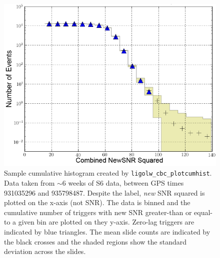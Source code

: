 \begin{figure}[p]
\label{fig:sample_plotcumhist}
\begin{center}
\includegraphics[width=5in]{figures/H1L1V1-ligolw_cbc_plotcumhist_FULL_DATA_CAT_4_VETO_cumhist_combined_snr_sq_ALL_DATA_PLOTTED_OPEN_BOX-931035296-4763191.png}
\end{center}
\caption{Sample cumulative histogram created by \texttt{ligolw\_cbc\_plotcumhist}. Data taken from $\sim6$ weeks of \ac{S6} data, between GPS times 931035296 and 935798487. Despite the label, \emph{new} \ac{SNR} squared is plotted on the x-axis (not \ac{SNR}). The data is binned and the cumulative number of triggers with new \ac{SNR} greater-than or equal-to a given bin are plotted on they y-axis. Zero-lag triggers are indicated by blue triangles. The mean slide counts are indicated by the black crosses and the shaded regions show the standard deviation across the slides.}
\end{figure}

